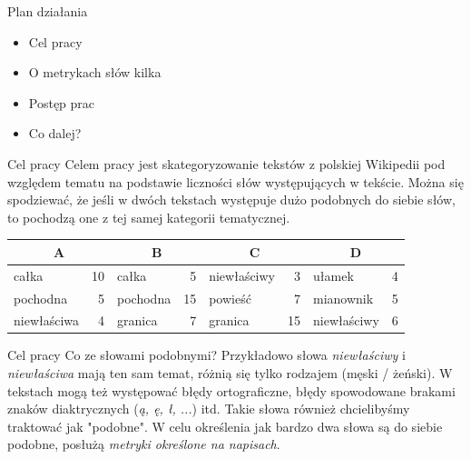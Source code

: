 \documentclass[11pt,pdftex,mathserif]{beamer}\usepackage[]{graphicx}\usepackage[]{color}
\theoremstyle{definition}
\begin{document}



\begin{frame}{Plan działania}
\begin{itemize}
  \item Cel pracy
  \item O metrykach słów kilka
  \item Postęp prac
  \item Co dalej?
\end{itemize}
\end{frame}


\begin{frame}{Cel pracy}
Celem pracy jest skategoryzowanie tekstów z polskiej Wikipedii pod względem tematu na podstawie liczności słów występujących w tekście. Można się spodziewać, że jeśli w dwóch tekstach występuje dużo podobnych do siebie słów, to pochodzą one z tej samej kategorii tematycznej. \\
\pause
\begin{tabular}{ |l r|l r|l r|l r| }
  \hline
  \multicolumn{2}{|c|}{A} & \multicolumn{2}{|c|}{B} & \multicolumn{2}{|c|}{C} & \multicolumn{2}{|c|}{D} \\
  \hline
  całka & 10 & całka & 5 & niewłaściwy & 3 & ułamek & 4 \\
  pochodna & 5 & pochodna & 15 & powieść & 7 & mianownik & 5 \\
  niewłaściwa & 4 & granica & 7 & granica & 15 & niewłaściwy & 6 \\
  \hline
\end{tabular}
\end{frame}


\begin{frame}{Cel pracy}
Co ze słowami podobnymi? Przykładowo słowa \emph{niewłaściwy} i \emph{niewłaściwa} mają ten sam temat, różnią się tylko rodzajem (męski / żeński). W tekstach mogą też występować błędy ortograficzne, błędy spowodowane brakami znaków diaktrycznych (\emph{ą, ę, ł, ...}) itd. Takie słowa również chcielibyśmy traktować jak "podobne". W celu określenia jak bardzo dwa słowa są do siebie podobne, posłużą \emph{metryki określone na napisach}.
\end{frame}
\end{document}
